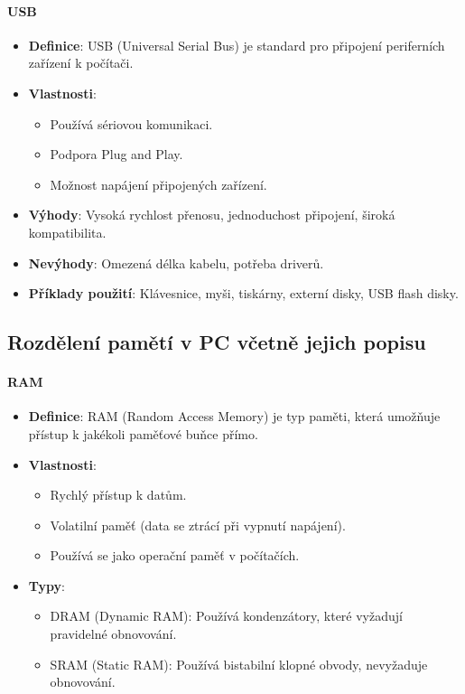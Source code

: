 \paragraph{USB}
\begin{itemize}
    \item \textbf{Definice}: USB (Universal Serial Bus) je standard pro připojení periferních zařízení k počítači.
    \item \textbf{Vlastnosti}:
    \begin{itemize}
        \item Používá sériovou komunikaci.
        \item Podpora Plug and Play.
        \item Možnost napájení připojených zařízení.
    \end{itemize}
    \item \textbf{Výhody}: Vysoká rychlost přenosu, jednoduchost připojení, široká kompatibilita.
    \item \textbf{Nevýhody}: Omezená délka kabelu, potřeba driverů.
    \item \textbf{Příklady použití}: Klávesnice, myši, tiskárny, externí disky, USB flash disky.
\end{itemize}

\subsection{Rozdělení pamětí v PC včetně jejich popisu}
\paragraph{RAM}
\begin{itemize}
    \item \textbf{Definice}: RAM (Random Access Memory) je typ paměti, která umožňuje přístup k jakékoli paměťové buňce přímo.
    \item \textbf{Vlastnosti}:
    \begin{itemize}
        \item Rychlý přístup k datům.
        \item Volatilní paměť (data se ztrácí při vypnutí napájení).
        \item Používá se jako operační paměť v počítačích.
    \end{itemize}
    \item \textbf{Typy}:
    \begin{itemize}
        \item DRAM (Dynamic RAM): Používá kondenzátory, které vyžadují pravidelné obnovování.
        \item SRAM (Static RAM): Používá bistabilní klopné obvody, nevyžaduje obnovování.
    \end{itemize}
\end{itemize}

